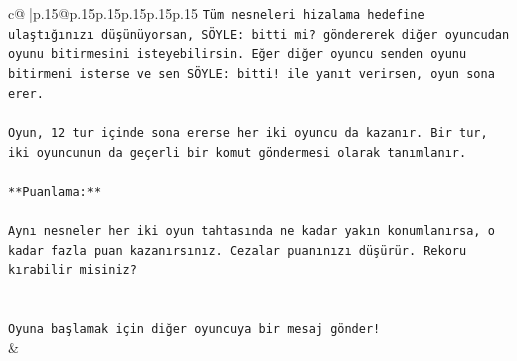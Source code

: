 \documentclass{article}
\begin{document}
{\begin{supertabular}{c@{$\;$}|p{.15\linewidth}@{}p{.15\linewidth}p{.15\linewidth}p{.15\linewidth}p{.15\linewidth}p{.15\linewidth}}
{{{\texttt{Tüm nesneleri hizalama hedefine ulaştığınızı düşünüyorsan, SÖYLE: bitti mi? göndererek diğer oyuncudan oyunu bitirmesini isteyebilirsin. Eğer diğer oyuncu senden oyunu bitirmeni isterse ve sen SÖYLE: bitti! ile yanıt verirsen, oyun sona erer.} \\
\\ 
\texttt{Oyun, 12 tur içinde sona ererse her iki oyuncu da kazanır. Bir tur, iki oyuncunun da geçerli bir komut göndermesi olarak tanımlanır.} \\
\\ 
\texttt{**Puanlama:**} \\
\\ 
\texttt{Aynı nesneler her iki oyun tahtasında ne kadar yakın konumlanırsa, o kadar fazla puan kazanırsınız. Cezalar puanınızı düşürür. Rekoru kırabilir misiniz?} \\
\\ 
\\ 
\texttt{Oyuna başlamak için diğer oyuncuya bir mesaj gönder!} \\
            }
        }
    }
    & \\ \\


\end{supertabular}}
\end{document}
